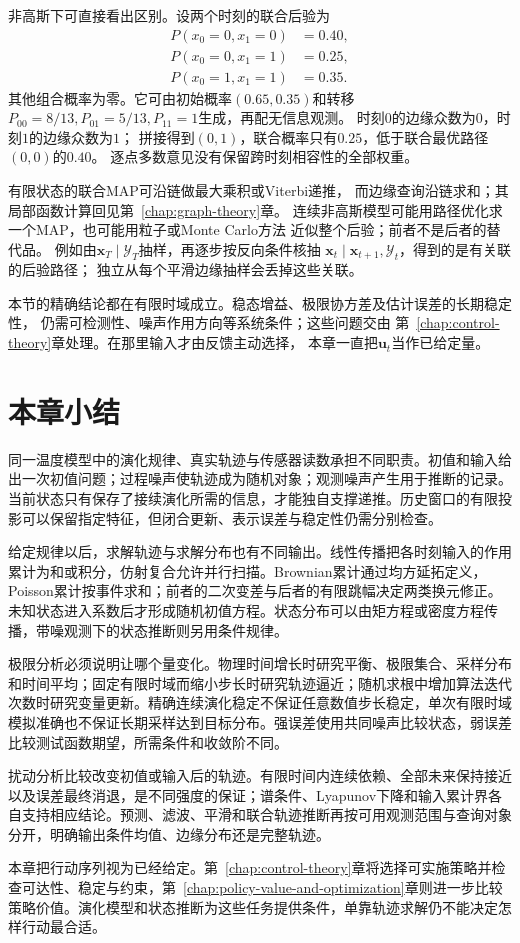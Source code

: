 非高斯下可直接看出区别。设两个时刻的联合后验为
\[
 \begin{aligned}
  P(x_0=0,x_1=0)&=0.40,\\
  P(x_0=0,x_1=1)&=0.25,\\
  P(x_0=1,x_1=1)&=0.35.
 \end{aligned}
\]
其他组合概率为零。它可由初始概率$(0.65,0.35)$和转移
$P_{00}=8/13,P_{01}=5/13,P_{11}=1$生成，再配无信息观测。
时刻$0$的边缘众数为$0$，时刻$1$的边缘众数为$1$；
拼接得到$(0,1)$，联合概率只有$0.25$，低于联合最优路径$(0,0)$的$0.40$。
逐点多数意见没有保留跨时刻相容性的全部权重。

有限状态的联合MAP可沿链做最大乘积或Viterbi递推，
而边缘查询沿链求和；其局部函数计算回见第~\ref{chap:graph-theory}章。
连续非高斯模型可能用路径优化求一个MAP，也可能用粒子或Monte Carlo方法
近似整个后验；前者不是后者的替代品。
例如由$\bm x_T\mid\mathcal Y_T$抽样，再逐步按反向条件核抽
$\bm x_t\mid\bm x_{t+1},\mathcal Y_t$，得到的是有关联的后验路径；
独立从每个平滑边缘抽样会丢掉这些关联。

本节的精确结论都在有限时域成立。稳态增益、极限协方差及估计误差的长期稳定性，
仍需可检测性、噪声作用方向等系统条件；这些问题交由
第~\ref{chap:control-theory}章处理。在那里输入才由反馈主动选择，
本章一直把$\bm u_t$当作已给定量。

\section{本章小结}
\label{sec:dynamical-systems-state-estimation-summary}

同一温度模型中的演化规律、真实轨迹与传感器读数承担不同职责。初值和输入给出一次初值问题；过程噪声使轨迹成为随机对象；观测噪声产生用于推断的记录。当前状态只有保存了接续演化所需的信息，才能独自支撑递推。历史窗口的有限投影可以保留指定特征，但闭合更新、表示误差与稳定性仍需分别检查。

给定规律以后，求解轨迹与求解分布也有不同输出。线性传播把各时刻输入的作用累计为和或积分，仿射复合允许并行扫描。Brownian累计通过均方延拓定义，Poisson累计按事件求和；前者的二次变差与后者的有限跳幅决定两类换元修正。未知状态进入系数后才形成随机初值方程。状态分布可以由矩方程或密度方程传播，带噪观测下的状态推断则另用条件规律。

极限分析必须说明让哪个量变化。物理时间增长时研究平衡、极限集合、采样分布和时间平均；固定有限时域而缩小步长时研究轨迹逼近；随机求根中增加算法迭代次数时研究变量更新。精确连续演化稳定不保证任意数值步长稳定，单次有限时域模拟准确也不保证长期采样达到目标分布。强误差使用共同噪声比较状态，弱误差比较测试函数期望，所需条件和收敛阶不同。

扰动分析比较改变初值或输入后的轨迹。有限时间内连续依赖、全部未来保持接近以及误差最终消退，是不同强度的保证；谱条件、Lyapunov下降和输入累计界各自支持相应结论。预测、滤波、平滑和联合轨迹推断再按可用观测范围与查询对象分开，明确输出条件均值、边缘分布还是完整轨迹。

本章把行动序列视为已经给定。第~\ref{chap:control-theory}章将选择可实施策略并检查可达性、稳定与约束，第~\ref{chap:policy-value-and-optimization}章则进一步比较策略价值。演化模型和状态推断为这些任务提供条件，单靠轨迹求解仍不能决定怎样行动最合适。
